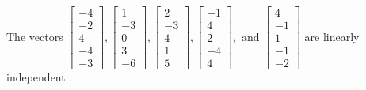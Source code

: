 \begin{exercise}
\begin{exerciseStatement}
  \end{exerciseStatement}
  \begin{exerciseAnswer}
   The vectors \(\left[\begin{array}{r}
-4 \\
-2 \\
4 \\
-4 \\
-3
\end{array}\right] , \left[\begin{array}{r}
1 \\
-3 \\
0 \\
3 \\
-6
\end{array}\right] , \left[\begin{array}{r}
2 \\
-3 \\
4 \\
1 \\
5
\end{array}\right] , \left[\begin{array}{r}
-1 \\
4 \\
2 \\
-4 \\
4
\end{array}\right] , \text{ and } \left[\begin{array}{r}
4 \\
-1 \\
1 \\
-1 \\
-2
\end{array}\right]\) are 
  	 linearly independent  .
  


  \end{exerciseAnswer}
\end{exercise}